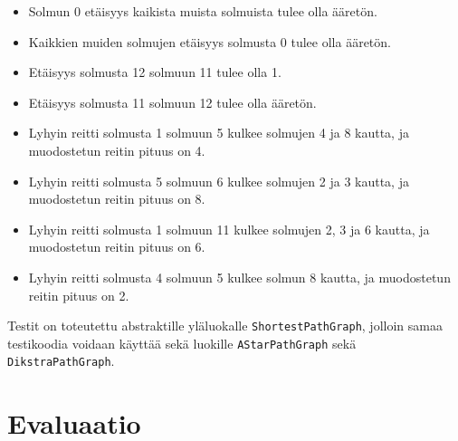\documentclass[10pt,a4paper]{article}
\begin{document}
\begin{itemize}
\item Solmun 0 etäisyys kaikista muista solmuista tulee olla ääretön.
\item Kaikkien muiden solmujen etäisyys solmusta 0 tulee olla ääretön.
\item Etäisyys solmusta 12 solmuun 11 tulee olla 1.
\item Etäisyys solmusta 11 solmuun 12 tulee olla ääretön.
\item Lyhyin reitti solmusta 1 solmuun 5 kulkee solmujen 4 ja 8 kautta, ja muodostetun reitin pituus on 4.
\item Lyhyin reitti solmusta 5 solmuun 6 kulkee solmujen 2 ja 3 kautta, ja muodostetun reitin pituus on 8.
\item Lyhyin reitti solmusta 1 solmuun 11 kulkee solmujen 2, 3 ja 6 kautta, ja muodostetun reitin pituus on 6.
\item Lyhyin reitti solmusta 4 solmuun 5 kulkee solmun 8 kautta, ja muodostetun reitin pituus on 2.
\end{itemize}

Testit on toteutettu abstraktille yläluokalle \texttt{ShortestPathGraph}, jolloin samaa testikoodia voidaan käyttää sekä luokille \texttt{AStarPathGraph} sekä \texttt{DikstraPathGraph}.

\section{Evaluaatio}
\end{document}
